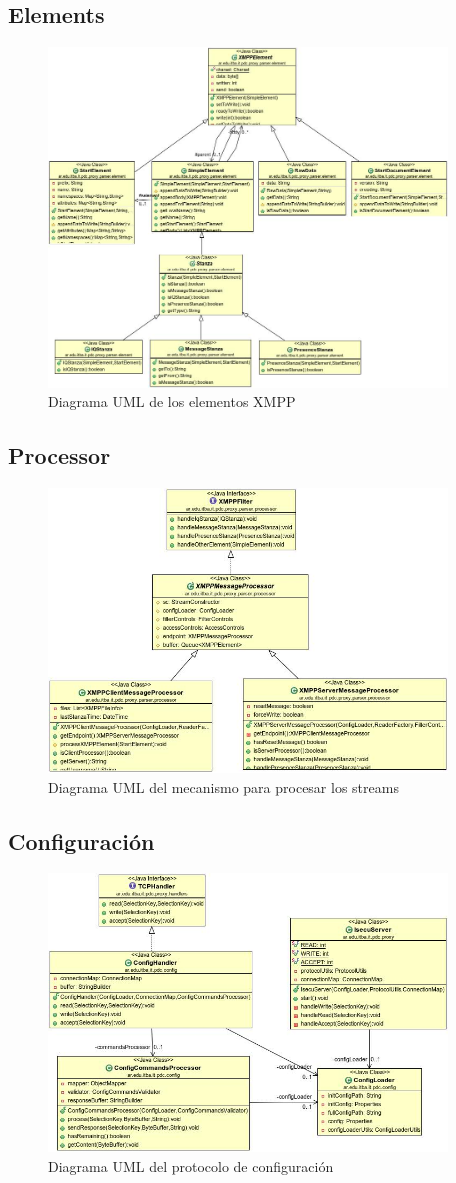 \documentclass[a4paper,10pt]{article}
\begin{document}
\subsection{Elements}
\begin{figure}[h]
	\centering
	\includegraphics[width=400px]{UML/Elements}  
	\caption{Diagrama UML de los elementos XMPP}
	\label{figure:Elements}
\end{figure}

\newpage
\subsection{Processor}
\begin{figure}[h]
	\centering
	\includegraphics[width=400px]{UML/Processor}  
	\caption{Diagrama UML del mecanismo para procesar los streams}
	\label{figure:Processor}
\end{figure}

\newpage
\subsection{Configuración}
\begin{figure}[h]
	\centering
	\includegraphics[width=400px]{UML/ConfigUML}  
	\caption{Diagrama UML del protocolo de configuración}
	\label{figure:ConfigUML}
\end{figure}
\end{document}
